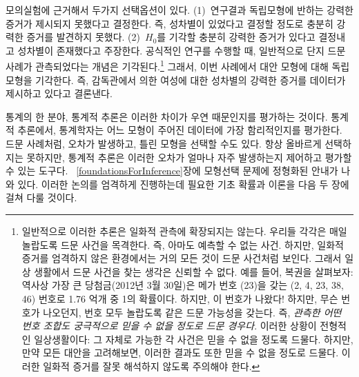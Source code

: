 모의실험에 근거해서 두가지 선택옵션이 있다. (1)~연구결과 독립모형에 반하는 강력한 증거가 제시되지 못했다고 결정한다.
즉, 성차별이 있었다고 결정할 정도로 충분히 강력한 증거를 발견하지 못했다. (2)~$H_0$를 기각할 충분히 강력한 증거가 있다고 결정내고 성차별이 존재했다고 주장한다. 공식적인 연구를 수행할 때, 일반적으로 단지 드문 사례가 관측되었다는 개념은 기각된다.\footnote{일반적으로 이러한 추론은 일화적 관측에 확장되지는 않는다. 우리들 각각은 매일 놀랍도록 드문 사건을 목격한다. 즉, 아마도 예측할 수 없는 사건. 하지만, 일화적 증거를 엄격하지 않은 환경에서는 거의 모든 것이 드문 사건처럼 보인다. 그래서 일상 생활에서 드문 사건을 찾는 생각은 신뢰할 수 없다. 예를 들어, 복권을 살펴보자: 역사상 가장 큰 당첨금(2012년 3월 30일)은 메가 번호 (23)을 갖는 (2, 4, 23, 38, 46) 번호로 1.76 억개 중 1의 확률이다. 하지만, 이 번호가 나왔다! 하지만, 무슨 번호가 나오던지, 번호 모두 놀랍도록 같은 드문 가능성을 갖는다. 즉, \emph{관측한 어떤 번호 조합도 궁극적으로 믿을 수 없을 정도로 드문 경우다}. 이러한 상황이 전형적인 일상생활이다: 그 자체로 가능한 각 사건은 믿을 수 없을 정도록 드물다. 하지만, 만약 모든 대안을 고려해보면, 이러한 결과도 또한 믿을 수 없을 정도로 드물다. 이러한 일화적 증거를 잘못 해석하지 않도록 주의해야 한다.}
그래서, 이번 사례에서 대안 모형에 대해 독립 모형을 기각한다. 즉, 감독관에서 의한 여성에 대한 성차별의 강력한 증거를 데이터가 제시하고 있다고 결론낸다.



통계의 한 분야, 통계적 추론은 이러한 차이가 우연 때문인지를 평가하는 것이다. 통계적 추론에서, 통계학자는 어느 모형이 주어진 데이터에 가장 함리적인지를 평가한다. 드문 사례처럼, 오차가 발생하고, 틀린 모형을 선택할 수도 있다.
항상 올바르게 선택하지는 못하지만, 통계적 추론은 이러한 오차가 얼마나 자주 발생하는지 제어하고 평가할 수 있는 도구다. ~\ref{foundationsForInference}장에 모형선택 문제에 정형화된 안내가 나와 있다. 이러한 논의를 엄격하게 진행하는데 필요한 기초 확률과 이론을 다음 두 장에 걸쳐 다룰 것이다.
